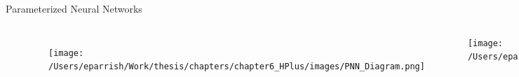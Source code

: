 \documentclass[aspectratio=169,xcolor=table]{beamer}
\begin{document}
\begin{frame}[t]{Parameterized Neural Networks}
\begin{columns}[t]
\begin{itemize}
      \end{itemize}
      \footnotesize
      \centering      
      \begin{figure}
        \centering
        \begin{columns}
        \texttt{[image: /Users/eparrish/Work/thesis/chapters/chapter6\_HPlus/images/PNN\_Diagram.png]}  
        \caption{\tiny \cite{PNN}}
        \end{columns}
      \end{figure}
      \texttt{[image: /Users/eparrish/Work/thesis/chapters/chapter6\_HPlus/images/kFoldDiagram\_noValid.pdf]}
      \begin{table}
        \end{table}
        \vspace{-0.2cm}
        \begin{table}
        \resizebox{.5\textwidth}{!}{
}
\end{table}
\end{columns}
\end{frame}
\end{document}
